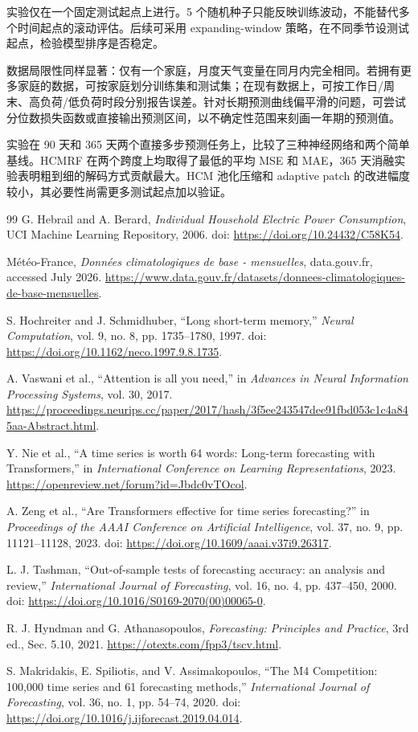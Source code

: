 \documentclass[11pt,a4paper]{article}
\begin{document}
实验仅在一个固定测试起点上进行。5 个随机种子只能反映训练波动，不能替代多个时间起点的滚动评估。后续可采用 expanding-window 策略，在不同季节设测试起点，检验模型排序是否稳定\cite{hyndman_tscv}。

数据局限性同样显著：仅有一个家庭，月度天气变量在同月内完全相同。若拥有更多家庭的数据，可按家庭划分训练集和测试集；在现有数据上，可按工作日/周末、高负荷/低负荷时段分别报告误差。针对长期预测曲线偏平滑的问题，可尝试分位数损失函数或直接输出预测区间，以不确定性范围来刻画一年期的预测值。

实验在 90 天和 365 天两个直接多步预测任务上，比较了三种神经网络和两个简单基线。HCMRF 在两个跨度上均取得了最低的平均 MSE 和 MAE，365 天消融实验表明粗到细的解码方式贡献最大。HCM 池化压缩和 adaptive patch 的改进幅度较小，其必要性尚需更多测试起点加以验证。

\begin{thebibliography}{99}
G. Hebrail and A. Berard, \textit{Individual Household Electric Power Consumption}, UCI Machine Learning Repository, 2006. doi: \url{https://doi.org/10.24432/C58K54}.

Météo-France, \textit{Données climatologiques de base - mensuelles}, data.gouv.fr, accessed July 2026. \url{https://www.data.gouv.fr/datasets/donnees-climatologiques-de-base-mensuelles}.

S. Hochreiter and J. Schmidhuber, ``Long short-term memory,'' \textit{Neural Computation}, vol. 9, no. 8, pp. 1735--1780, 1997. doi: \url{https://doi.org/10.1162/neco.1997.9.8.1735}.

A. Vaswani et al., ``Attention is all you need,'' in \textit{Advances in Neural Information Processing Systems}, vol. 30, 2017. \url{https://proceedings.neurips.cc/paper/2017/hash/3f5ee243547dee91fbd053c1c4a845aa-Abstract.html}.

Y. Nie et al., ``A time series is worth 64 words: Long-term forecasting with Transformers,'' in \textit{International Conference on Learning Representations}, 2023. \url{https://openreview.net/forum?id=Jbdc0vTOcol}.

A. Zeng et al., ``Are Transformers effective for time series forecasting?'' in \textit{Proceedings of the AAAI Conference on Artificial Intelligence}, vol. 37, no. 9, pp. 11121--11128, 2023. doi: \url{https://doi.org/10.1609/aaai.v37i9.26317}.

L. J. Tashman, ``Out-of-sample tests of forecasting accuracy: an analysis and review,'' \textit{International Journal of Forecasting}, vol. 16, no. 4, pp. 437--450, 2000. doi: \url{https://doi.org/10.1016/S0169-2070(00)00065-0}.

R. J. Hyndman and G. Athanasopoulos, \textit{Forecasting: Principles and Practice}, 3rd ed., Sec. 5.10, 2021. \url{https://otexts.com/fpp3/tscv.html}.

S. Makridakis, E. Spiliotis, and V. Assimakopoulos, ``The M4 Competition: 100,000 time series and 61 forecasting methods,'' \textit{International Journal of Forecasting}, vol. 36, no. 1, pp. 54--74, 2020. doi: \url{https://doi.org/10.1016/j.ijforecast.2019.04.014}.
\end{thebibliography}
\end{document}
